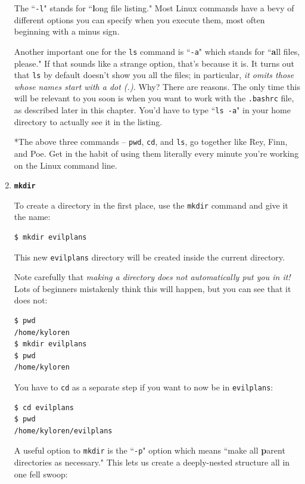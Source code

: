 \begin{enumerate}
The ``\texttt{-l}" stands for ``\textbf{l}ong file listing." Most Linux
commands have a bevy of different options you can specify when you execute
them, most often beginning with a minus sign.

Another important one for the \texttt{ls} command is ``\texttt{-a}" which
stands for ``\textbf{a}ll files, please." If that sounds like a strange
option, that's because it is. It turns out that \texttt{ls} by default doesn't
show you all the files; in particular, \textit{it omits those whose names
start with a dot (.).} Why? There are reasons. The only time this will be
relevant to you soon is when you want to work with the \texttt{.bashrc} file,
as described later in this chapter. You'd have to type ``\texttt{ls -a}" in
your home directory to actually see it in the listing.


\bigline
\vspace{.1in}
*The above three commands -- \texttt{pwd}, \texttt{cd}, and \texttt{ls}, go
together like Rey, Finn, and Poe. Get in the habit of using them literally
every minute you're working on the Linux command line.
\vspace{.1in}
\bigline

\item \textbf{\texttt{mkdir}}

To create a directory in the first place, use the \texttt{mkdir} command and
give it the name:

\begin{verbatim}
$ mkdir evilplans
\end{verbatim}

This new \texttt{evilplans} directory will be created inside the current
directory.

Note carefully that \textit{making a directory does not automatically put you
in it!} Lots of beginners mistakenly think this will happen, but you can see
that it does not:

\begin{verbatim}
$ pwd
/home/kyloren
$ mkdir evilplans
$ pwd
/home/kyloren
\end{verbatim}

You have to \texttt{cd} as a separate step if you want to now be in
\texttt{evilplans}:

\begin{verbatim}
$ cd evilplans
$ pwd
/home/kyloren/evilplans
\end{verbatim}

A useful option to \texttt{mkdir} is the ``\texttt{-p}" option which means
``make all \textbf{p}arent directories as necessary." This lets us create a
deeply-nested structure all in one fell swoop:


\end{enumerate}
